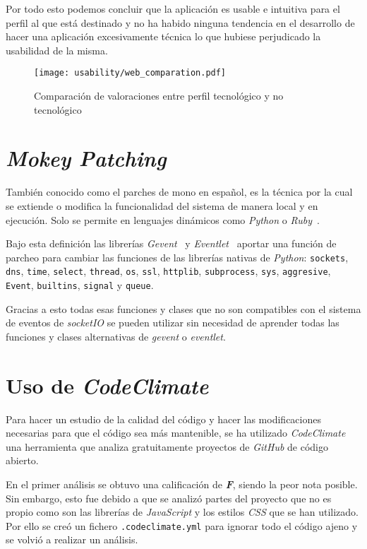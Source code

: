 Por todo esto podemos concluir que la aplicación es usable e intuitiva para el perfil al que está destinado y no ha habido ninguna tendencia en el desarrollo de hacer una aplicación excesivamente técnica lo que hubiese perjudicado la usabilidad de la misma.

\begin{figure}[h]
	\centering
	\texttt{[image: usability/web\_comparation.pdf]}
	\caption{Comparación de valoraciones entre perfil tecnológico y no tecnológico}
	\label{fig:usab_comp}
\end{figure}

\section{\textit{Mokey Patching}}\label{cap:mokey}

También conocido como el parches de mono en español, es la técnica por la cual se extiende o modifica la funcionalidad del sistema de manera local y en ejecución. Solo se permite en lenguajes dinámicos como \textit{Python} o \textit{Ruby}~\cite{wiki:monkey_patch}.

Bajo esta definición las librerías \textit{Gevent}~\cite{tool:gevent} y \textit{Eventlet}~\cite{tool:eventlet} aportar una función de parcheo para cambiar las funciones de las librerías nativas de \textit{Python}: \texttt{sockets}, \texttt{dns}, \texttt{time}, \texttt{select}, \texttt{thread}, \texttt{os}, \texttt{ssl}, \texttt{httplib}, \texttt{subprocess}, \texttt{sys}, \texttt{aggresive}, \texttt{Event}, \texttt{builtins}, \texttt{signal} y \texttt{queue}.

Gracias a esto todas esas funciones y clases que no son compatibles con el sistema de eventos de \textit{socketIO} se pueden utilizar sin necesidad de aprender todas las funciones y clases alternativas de \textit{gevent} o \textit{eventlet}.

\section{Uso de \textit{CodeClimate}}
Para hacer un estudio de la calidad del código y hacer las modificaciones necesarias para que el código sea más mantenible, se ha utilizado \textit{CodeClimate} una herramienta que analiza gratuitamente proyectos de \textit{GitHub} de código abierto.

En el primer análisis se obtuvo una calificación de \textbf{\textit{F}}, siendo la peor nota posible. Sin embargo, esto fue debido a que se analizó partes del proyecto que no es propio como son las librerías de \textit{JavaScript} y los estilos \textit{CSS} que se han utilizado. Por ello se creó un fichero \texttt{.codeclimate.yml} para ignorar todo el código ajeno y se volvió a realizar un análisis.

